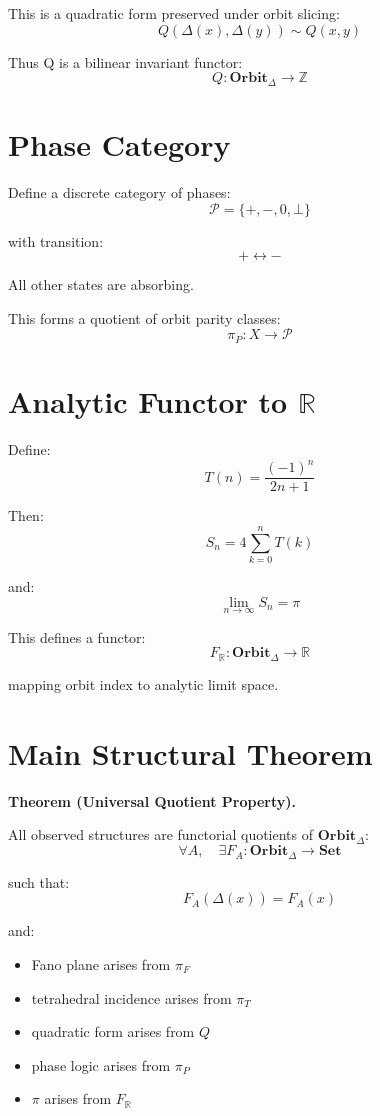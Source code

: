 \documentclass[11pt]{article}
\begin{document}
This is a quadratic form preserved under orbit slicing:
\[
Q(\Delta(x), \Delta(y)) \sim Q(x,y)
\]

Thus Q is a bilinear invariant functor:
\[
Q : \mathbf{Orbit}_\Delta \to \mathbb{Z}
\]

\section{Phase Category}

Define a discrete category of phases:
\[
\mathcal{P} = \{+, -, 0, \bot\}
\]

with transition:
\[
+ \leftrightarrow -
\]

All other states are absorbing.

This forms a quotient of orbit parity classes:
\[
\pi_P : X \to \mathcal{P}
\]

\section{Analytic Functor to $\mathbb{R}$}

Define:
\[
T(n) = \frac{(-1)^n}{2n+1}
\]

Then:
\[
S_n = 4 \sum_{k=0}^{n} T(k)
\]

and:
\[
\lim_{n \to \infty} S_n = \pi
\]

This defines a functor:
\[
F_{\mathbb{R}} : \mathbf{Orbit}_\Delta \to \mathbb{R}
\]

mapping orbit index to analytic limit space.

\section{Main Structural Theorem}

\textbf{Theorem (Universal Quotient Property).}

All observed structures are functorial quotients of $\mathbf{Orbit}_\Delta$:
\[
\forall A,\quad \exists F_A : \mathbf{Orbit}_\Delta \to \mathbf{Set}
\]

such that:
\[
F_A(\Delta(x)) = F_A(x)
\]

and:

\begin{itemize}
\item Fano plane arises from $\pi_F$
\item tetrahedral incidence arises from $\pi_T$
\item quadratic form arises from $Q$
\item phase logic arises from $\pi_P$
\item $\pi$ arises from $F_{\mathbb{R}}$
\end{itemize}
\end{document}
